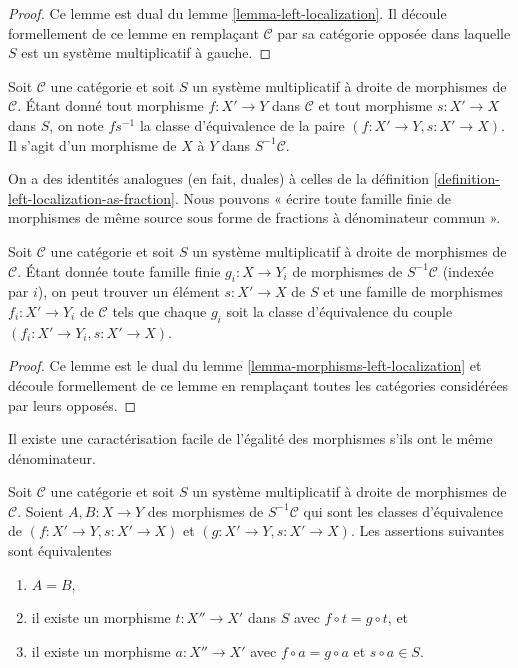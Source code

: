 \begin{proof}
Ce lemme est dual du lemme \ref{lemma-left-localization}. Il découle
formellement de ce lemme en remplaçant $\mathcal{C}$ par sa catégorie opposée
dans laquelle $S$ est un système multiplicatif à gauche.
\end{proof}

\begin{definition}
\label{definition-right-localization-as-fraction}
Soit $\mathcal{C}$ une catégorie et soit $S$ un système multiplicatif à droite
de morphismes de $\mathcal{C}$. Étant donné tout morphisme $f : X' \to Y$ dans
$\mathcal{C}$ et tout morphisme $s : X' \to X$ dans $S$, on note {\it $f s^{-1}$} la classe d'équivalence de la paire $(f : X' \to Y, s : X' \to X)$.
Il s'agit d'un morphisme de $X$ à $Y$ dans $S^{-1} \mathcal{C}$.
\end{definition}

\noindent
On a des identités analogues (en fait, duales) à celles de la définition
\ref{definition-left-localization-as-fraction}. Nous pouvons « écrire
toute famille finie de morphismes de même source sous forme de
fractions à dénominateur commun ».

\begin{lemma}
\label{lemma-morphisms-right-localization}
Soit $\mathcal{C}$ une catégorie et soit $S$ un système multiplicatif à droite
de morphismes de $\mathcal{C}$. Étant donnée toute famille finie $g_i : X \to Y_i$ de morphismes de $S^{-1}\mathcal{C}$ (indexée par $i$), on peut
trouver un élément $s : X' \to X$ de $S$ et une famille de morphismes $f_i : X' \to Y_i$ de $\mathcal{C}$ tels que chaque $g_i$ soit la classe d'équivalence du
couple $(f_i : X' \to Y_i, s : X' \to X)$.
\end{lemma}

\begin{proof}
Ce lemme est le dual du lemme \ref{lemma-morphisms-left-localization} et
découle formellement de ce lemme en remplaçant toutes les catégories considérées
par leurs opposés.
\end{proof}

\noindent
Il existe une caractérisation facile de l'égalité des morphismes s'ils ont le
même dénominateur.

\begin{lemma}
\label{lemma-equality-morphisms-right-localization}
Soit $\mathcal{C}$ une catégorie et soit $S$ un système multiplicatif à droite
de morphismes de $\mathcal{C}$. Soient $A, B : X \to Y$ des morphismes de
$S^{-1}\mathcal{C}$ qui sont les classes d'équivalence de $(f : X' \to Y, s : X' \to X)$ et $(g : X' \to Y, s : X' \to X)$. Les assertions suivantes sont
équivalentes
\begin{enumerate}
\item $A = B$,
\item il existe un morphisme $t : X'' \to X'$ dans $S$ avec $f \circ t = g \circ t$, et
\item il existe un morphisme $a : X'' \to X'$ avec $f \circ a = g \circ a$ et
$s \circ a \in S$.
\end{enumerate}
\end{lemma}

